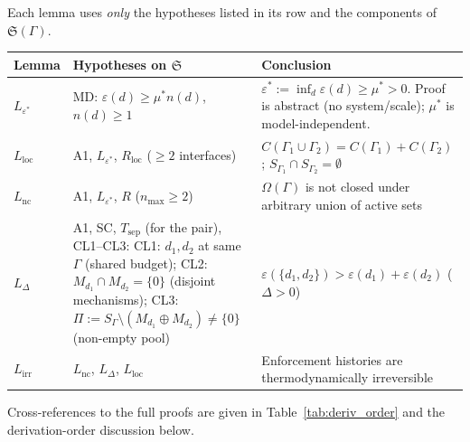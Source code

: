 \documentclass[11pt]{article}
\theoremstyle{remark}
\begin{document}
\begin{tcolorbox}[defbox, title={Formal Specification IV: Lemma Hypotheses}]

Each lemma uses \emph{only} the hypotheses listed in its row and the components of $\mathfrak{S}(\Gamma)$.

\smallskip
\begin{tabular}{@{}p{1.8cm}p{4.8cm}p{5.8cm}@{}}
\textbf{Lemma} & \textbf{Hypotheses on $\mathfrak{S}$} & \textbf{Conclusion} \\[2pt]
\hline\noalign{\smallskip}
$L_{\varepsilon^*}$ & MD: $\varepsilon(d) \ge \mu^* n(d)$, $n(d) \ge 1$ & $\varepsilon^* := \inf_d \varepsilon(d) \ge \mu^* > 0$. \newline Proof is abstract (no system/scale); $\mu^*$ is model-independent. \\[3pt]
$L_{\mathrm{loc}}$ & A1, $L_{\varepsilon^*}$, $R_{\mathrm{loc}}$ ($\ge 2$ interfaces) & $C(\Gamma_1 \cup \Gamma_2) = C(\Gamma_1) + C(\Gamma_2)$; $S_{\Gamma_1} \cap S_{\Gamma_2} = \emptyset$ \\[3pt]
$L_{\mathrm{nc}}$ & A1, $L_{\varepsilon^*}$, $R$ ($n_{\max} \ge 2$) & $\Omega(\Gamma)$ is not closed under arbitrary union of active sets \\[3pt]
$L_\Delta$ & A1, SC, $T_{\mathrm{sep}}$ (for the pair), CL1--CL3: \newline CL1: $d_1, d_2$ at same $\Gamma$ (shared budget); \newline CL2: $M_{d_1} \cap M_{d_2} = \{0\}$ (disjoint mechanisms); \newline CL3: $\Pi := S_\Gamma \setminus (M_{d_1} \oplus M_{d_2}) \ne \{0\}$ (non-empty pool) & $\varepsilon(\{d_1,d_2\}) > \varepsilon(d_1) + \varepsilon(d_2)$ \quad ($\Delta > 0$) \\[3pt]
$L_{\mathrm{irr}}$ & $L_{\mathrm{nc}}$, $L_\Delta$, $L_{\mathrm{loc}}$ & Enforcement histories are thermodynamically irreversible \\
\end{tabular}

\smallskip\noindent Cross-references to the full proofs are given in Table~\ref{tab:deriv_order} and the derivation-order discussion below.
\end{tcolorbox}
\end{document}
